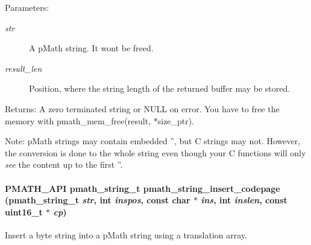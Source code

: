 \begin{Desc}
\item[Parameters:]
\begin{description}
\item[{\em str}]A pMath string. It wont be freed. \item[{\em result\_\-len}]Position, where the string length of the returned buffer may be stored. \end{description}
\end{Desc}
\begin{Desc}
\item[Returns:]A zero terminated string or NULL on error. You have to free the memory with pmath\_\-mem\_\-free(result, $\ast$size\_\-ptr).\end{Desc}
\begin{Desc}
\item[Note:]pMath strings may contain embedded '', but C strings may not. However, the conversion is done to the whole string even though your C functions will only {\em see\/} the content up to the first ''. \end{Desc}
\hypertarget{group__strings_g5008b0b2e682b283772e10bf38666ffe}{
\paragraph[{pmath\_\-string\_\-insert\_\-codepage}]{\setlength{\rightskip}{0pt plus 5cm}PMATH\_\-API {\bf pmath\_\-string\_\-t} pmath\_\-string\_\-insert\_\-codepage ({\bf pmath\_\-string\_\-t} {\em str}, \/  int {\em inspos}, \/  const char $\ast$ {\em ins}, \/  int {\em inslen}, \/  const uint16\_\-t $\ast$ {\em cp})}\hfill}
\label{group__strings_g5008b0b2e682b283772e10bf38666ffe}


Insert a byte string into a pMath string using a translation array. 

